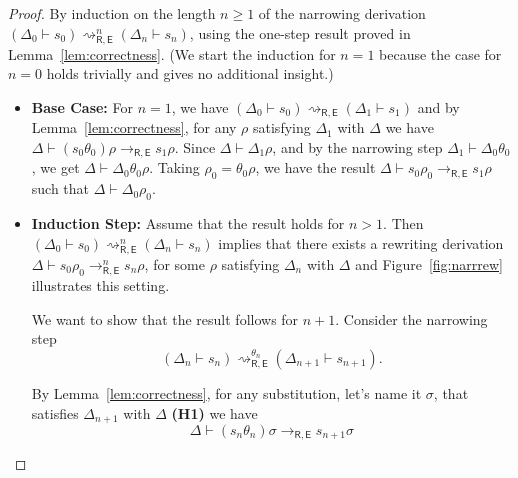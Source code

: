 \documentclass[submission,copyright,creativecommons]{eptcs}
\newcommand{\daniele}[1]{\textcolor{cyan}{#1}}
\newcommand{\theory}[1]{\ensuremath{\mathsf{#1}}}
\theoremstyle{plain}
\theoremstyle{definition}
\theoremstyle{remark}
\begin{document}
\begin{proof}
By induction on the length $n\geq 1$ of the narrowing derivation $(\Delta_0\vdash s_0) \rightsquigarrow^{n}_{\theory{R,E}} (\Delta_n \vdash s_n)$, 
using the one-step result proved in Lemma~\ref{lem:correctness}. (We start the induction for $n=1$ because the case for $n=0$ holds trivially and gives no additional insight.) 
\begin{itemize}
    \item \textbf{Base Case:} For $n=1$, 
    we have $(\Delta_0\vdash s_0) \rightsquigarrow_{\theory{R,E}} (\Delta_1 \vdash s_1)$ and by Lemma~\ref{lem:correctness}, for any $\rho$ satisfying $\Delta_1$ with $\Delta$ we have $\Delta \vdash  (s_0\theta_0)\rho \rightarrow_{\theory{R,E}} s_1\rho$. Since $\Delta\vdash \Delta_1\rho$, and by the narrowing step $\Delta_1\vdash \Delta_0\theta_0$, we get $\Delta\vdash \Delta_0\theta_0\rho$. Taking $\rho_0 = \theta_0\rho$, we have the result
    $\Delta\vdash s_0\rho_0 \to_\theory{R,E} s_1\rho$
    such that $\Delta\vdash \Delta_0\rho_0$.
    \item \textbf{Induction Step:} Assume that the result holds for $n>1$. Then 
    $(\Delta_0 \vdash s_0) \rightsquigarrow^{n}_{\theory{R,E}} (\Delta_n \vdash s_n)$
    implies that there exists a rewriting derivation
    $\Delta \vdash s_0\rho_0 \rightarrow^{n}_{\theory{R,E}} s_n\rho$, for some $\rho$ satisfying $\Delta_n$ with $\Delta$
    and Figure~\ref{fig:narrrew} illustrates this setting.
    
    We want to show that the result follows for $n+1$. Consider the narrowing step 
    $$(\Delta_n \vdash s_n) \rightsquigarrow^{\theta_n}_\theory{R,E} (\Delta_{n+1} \vdash s_{n+1}).$$
    
    
   By Lemma~\ref{lem:correctness}, for any substitution, let's name it $\sigma$, that satisfies $\Delta_{n+1}$ with $\Delta$ {\bf (H1)}
    we have
    \begin{equation}\label{eq:narrow}
        \Delta \vdash (s_n\theta_n)\sigma \to_{\theory{R,E}} s_{n+1}\sigma
    \end{equation}
  

\end{itemize}
\end{proof}
\end{document}
